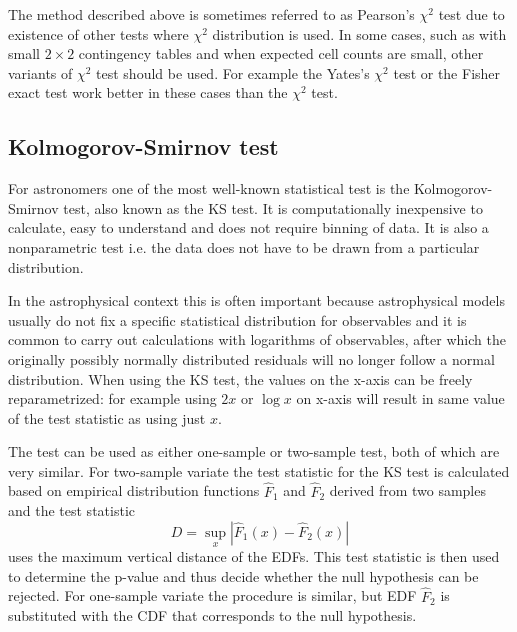 \documentclass[english, oneside]{HYgradu}
\begin{document}
\reversemarginpar
{}
The method described above is sometimes referred to as Pearson's $\chi^2$ test due to existence of other tests where $\chi^2$ distribution is used. In some cases, such as with small $2 \times 2$ contingency tables and when expected cell counts are small, other variants of $\chi^2$ test should be used. For example the Yates's $\chi^2$ test or the Fisher exact test work better in these cases than the $\chi^2$ test. \citep{corder2014nonparametric}



\subsection{Kolmogorov-Smirnov test}
For astronomers one of the most well-known statistical test is the Kolmogorov-Smirnov test, also known as the KS test. It is computationally inexpensive to calculate, easy to understand and does not require binning of data. It is also a nonparametric test i.e. the data does not have to be drawn from a particular distribution. \citep{feigelson2012modern}

In the astrophysical context this is often important because astrophysical models usually do not fix a specific statistical distribution for observables and it is common to carry out calculations with logarithms of observables, after which the originally possibly normally distributed residuals  will no longer follow a normal distribution. When using the KS test, the values on the x-axis can be freely reparametrized: for example using $2x$ or $\log x$ on x-axis will result in same value of the test statistic as using just $x$. \citep{feigelson2012modern, press2007numerical}

The test can be used as either one-sample or two-sample test, both of which are very similar. For two-sample variate the test statistic for the KS test is calculated based on empirical distribution functions $\hat{F}_1$ and $\hat{F}_2$ derived from two samples and the test statistic
\begin{equation}
	D = \sup_{x} |\hat{F}_1(x) - \hat{F}_2(x)|
\end{equation}
uses the maximum vertical distance of the EDFs. This test statistic is then used to determine the p-value and thus decide whether the null hypothesis can be rejected. For one-sample variate the procedure is similar, but EDF $\hat{F}_2$ is substituted with the CDF that corresponds to the null hypothesis. \citep{feigelson2012modern, bohm2010introduction}
\end{document}
